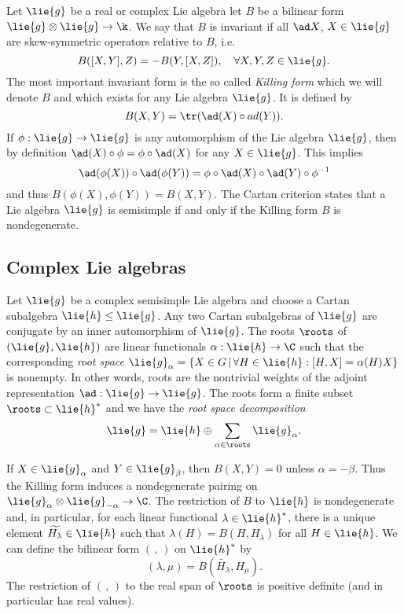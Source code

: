 Let $\lie{g}$ be a real or complex Lie algebra let $B$ be a bilinear form $\lie{g}\otimes \lie{g} \to \k$. We say that $B$ is invariant if all $\ad X$, $X\in\lie{g}$ are skew-symmetric operators relative to $B$, i.e.
\[
 B([X,Y],Z) = -B(Y,[X,Z]), \quad \forall X,Y,Z \in \lie{g}.
\]
The most important invariant form is the so called \emph{Killing form} which we will denote $B$ and which exists for any Lie algebra $\lie{g}$. It is defined by
\[
 B(X,Y) = \tr(\ad(X) \circ ad(Y)).
\]
If $\phi:\lie{g} \to \lie{g}$ is any automorphism of the Lie algebra $\lie{g}$, then by definition $\ad(X) \circ \phi = \phi \circ \ad(X)$ for any $X\in\lie{g}$. This implies
\[
 \ad(\phi(X)) \circ \ad(\phi(Y)) = \phi \circ \ad(X)\circ\ad(Y)\circ\phi^{-1}
\]
and thus $B(\phi(X),\phi(Y)) = B(X,Y)$. The Cartan criterion states that a Lie algebra $\lie{g}$ is semisimple if and only if the Killing form $B$ is nondegenerate.

\subsection{Complex Lie algebras}

Let $\lie{g}$ be a complex semisimple Lie algebra and choose a Cartan subalgebra $\lie{h} \leq \lie{g}$. Any two Cartan subalgebras of $\lie{g}$ are conjugate by an inner automorphism of $\lie{g}$. The roots $\roots$ of $(\lie{g},\lie{h})$ are linear functionals $\alpha: \lie{h} \to \C$ such that the corresponding \emph{root space} $\lie{g}_\alpha = \{ X\in G \,|\,\forall H\in \lie{h}: [H,X] = \alpha(H) X \}$ is nonempty. In other words, roots are the nontrivial weights of the adjoint representation $\ad:\lie{g}\to\lie{g}$. The roots form a finite subset $\roots \subset \lie{h}^*$ and we have the \emph{root space decomposition}
\[
 \lie{g} = \lie{h} \oplus \sum_{\alpha \in \roots} \lie{g}_\alpha.
\]

If $X\in\lie{g}_\alpha$ and $Y\in\lie{g}_\beta$, then $B(X,Y) = 0$ unless $\alpha = -\beta$. Thus the Killing form induces a nondegenerate pairing on $\lie{g}_\alpha \otimes \lie{g}_{-\alpha}\to \C$. The restriction of $B$ to $\lie{h}$ is nondegenerate and, in particular, for each linear functional $\lambda \in \lie{h}^*$, there is a unique
 element $\widetilde{H_\lambda} \in \lie{h}$ such that $\lambda(H) = B(H,H_\lambda)$ for all $H\in\lie{h}$. We can define the bilinear form $(\, , \,)$ on $\lie{h}^*$ by
\[
 (\lambda,\mu) = B(\widetilde{H_\lambda}, H_\mu).
\]
The restriction of $(\, , \, )$ to the real span of $\roots$ is positive definite (and in particular has real values).

